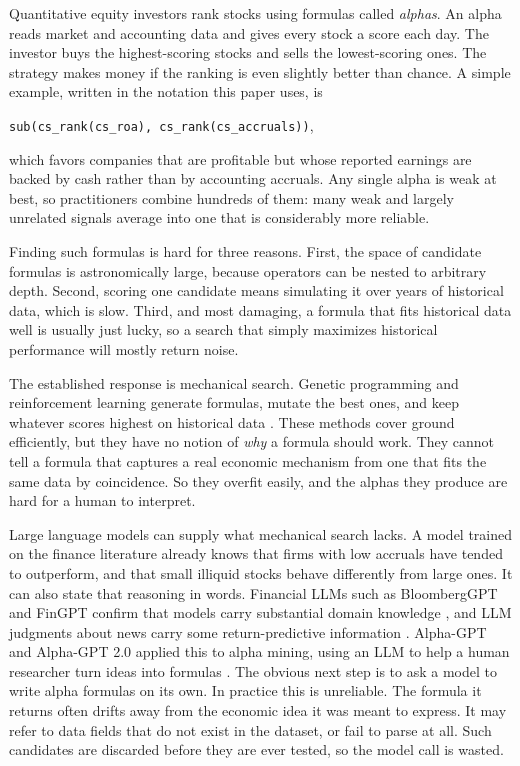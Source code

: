 \documentclass{article}
\theoremstyle{definition}
\theoremstyle{plain}
\theoremstyle{remark}
\begin{document}
Quantitative equity investors rank stocks using formulas called \emph{alphas}. An alpha
reads market and accounting data and gives every stock a score each day. The investor
buys the highest-scoring stocks and sells the lowest-scoring ones. The strategy makes
money if the ranking is even slightly better than chance. A simple example, written in
the notation this paper uses, is
\begin{center}
\texttt{sub(cs\_rank(cs\_roa), cs\_rank(cs\_accruals))},
\end{center}
which favors companies that are profitable but whose reported earnings are backed by cash
rather than by accounting accruals. Any single alpha is weak at best, so practitioners
combine hundreds of them: many weak and largely unrelated signals average into one that
is considerably more reliable.

Finding such formulas is hard for three reasons. First, the space of candidate formulas
is astronomically large, because operators can be nested to arbitrary depth. Second,
scoring one candidate means simulating it over years of historical data, which is slow.
Third, and most damaging, a formula that fits historical data well is usually just lucky,
so a search that simply maximizes historical performance will mostly return noise.

The established response is mechanical search. Genetic programming and reinforcement
learning generate formulas, mutate the best ones, and keep whatever scores highest on
historical data \cite{koza,alphagen,autoalpha-evo}. These methods cover ground
efficiently, but they have no notion of \emph{why} a formula should work. They cannot
tell a formula that captures a real economic mechanism from one that fits the same data
by coincidence. So they overfit easily, and the alphas they produce are hard for a human
to interpret.

Large language models can supply what mechanical search lacks. A model trained on the
finance literature already knows that firms with low accruals have tended to outperform,
and that small illiquid stocks behave differently from large ones. It can also state that
reasoning in words. Financial LLMs such as BloombergGPT and FinGPT confirm that models
carry substantial domain knowledge \cite{bloomberggpt,fingpt}, and LLM judgments about
news carry some return-predictive information \cite{lopezlira}. Alpha-GPT and Alpha-GPT
2.0 applied this to alpha mining, using an LLM to help a human researcher turn ideas into
formulas \cite{alphagpt1,alphagpt2}. The obvious next step is to ask a model to write
alpha formulas on its own. In practice this is unreliable. The formula it returns often
drifts away from the economic idea it was meant to express. It may refer to data fields
that do not exist in the dataset, or fail to parse at all. Such candidates are discarded
before they are ever tested, so the model call is wasted.
\end{document}
